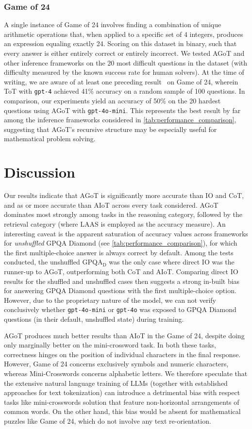 \documentclass{article}
\begin{document}
\subsubsection{Game of 24}
A single instance of Game of 24 involves finding a combination of unique arithmetic operations that, when applied to a specific set of 4 integers, produces an expression equaling exactly 24. Scoring on this dataset in binary, such that every answer is either entirely correct or entirely incorrect. We tested AGoT and other inference frameworks on the 20 most difficult questions in the dataset (with difficulty measured by the known success rate for human solvers). At the time of writing, we are aware of at least one preceding result~\citep{li2025searcho1agenticsearchenhancedlarge} on Game of 24, wherein ToT with \texttt{gpt-4} achieved 41\% accuracy on a random sample of 100 questions. In comparison, our experiments yield an accuracy of 50\% on the 20 hardest questions using AGoT with \texttt{gpt-4o-mini}. This represents the best result by far among the inference frameworks considered in \autoref{tab:performance_comparison}, suggesting that AGoT's recursive structure may be especially useful for mathematical problem solving.

\section{Discussion}
Our results indicate that AGoT is significantly more accurate than IO and CoT, and as or more accurate than AIoT across every task considered. AGoT dominates most strongly among tasks in the reasoning category, followed by the retrieval category (where LAAS is employed as the accuracy measure). An interesting caveat is the apparent saturation of accuracy values across frameworks for \textit{unshuffled} GPQA Diamond (see \autoref{tab:performance_comparison}), for which the first multiple-choice answer is always correct by default. Among the tests conducted, the unshuffled GPQA$_\text{D}$ was the only case where direct IO was the runner-up to AGoT, outperforming both CoT and AIoT. Comparing direct IO results for the shuffled and unshuffled cases then suggests a strong in-built bias for answering GPQA Diamond questions with the first multiple-choice option. However, due to the proprietary nature of the model, we can not verify conclusively whether \texttt{gpt-4o-mini} or \texttt{gpt-4o} was exposed to GPQA Diamond questions (in their default, unshuffled state) during training.

AGoT produces much better results than AIoT in the Game of 24, despite doing only marginally better on the mini-crossword task. In both these tasks, correctness hinges on the position of individual characters in the final response. However, Game of 24 concerns exclusively symbols and numeric characters, whereas Mini-Crosswords concerns alphabetic letters. We therefore speculate that the extensive natural language training of LLMs (together with established approaches for text tokenization) can introduce a detrimental bias with respect tasks like mini-crosswords solution that feature non-horizontal arrangements of common words. On the other hand, this bias would be absent for mathematical puzzles like Game of 24, which do not involve any text re-orientation.
\end{document}
